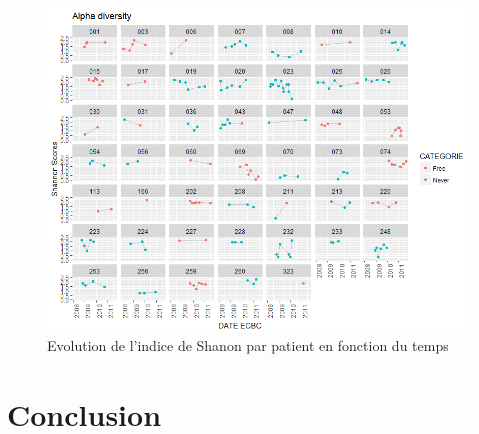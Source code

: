 \documentclass[12pt,a4paper]{article}
\begin{document}
\begin{figure}
\begin{center}
\includegraphics[scale=0.80]{img/alpha_shannon.png}\hfill
\end{center}
\caption{Evolution de l'indice de Shanon par patient en fonction du temps}
\label{alphaShannon}
\end{figure}


\section{Conclusion}




\newpage




\end{document}
